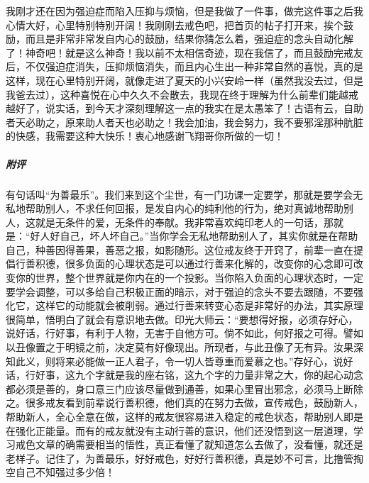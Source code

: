 \begin{case}
    我刚才还在因为强迫症而陷入压抑与烦恼，但是我做了一件事，做完这件事之后我心情大好，心里特别特别开阔！我刚刚去戒色吧，把首页的帖子打开来，挨个鼓励，而且是非常非常发自内心的鼓励，结果你猜怎么着，强迫症的念头自动化解了！神奇吧！就是这么神奇！我以前不太相信奇迹，现在我信了，而且鼓励完戒友后，不仅强迫症消失，压抑烦恼消失，而且内心生出一种非常自然的喜悦，真的是这样，现在心里特别开阔，就像走进了夏天的小兴安岭一样（虽然我没去过，但是我爸去过），这种喜悦在心中久久不会散去，我现在终于理解为什么前辈们能越戒越好了，说实话，到今天才深刻理解这一点的我实在是太愚笨了！古语有云，自助者天必助之，原来助人者天也必助之！我会加油，我会努力，我不要邪淫那种肮脏的快感，我需要这种大快乐！衷心地感谢飞翔哥你所做的一切！
    \subparagraph{附评} 有句话叫“为善最乐”。我们来到这个尘世，有一门功课一定要学，那就是要学会无私地帮助别人，不求任何回报，是发自内心的纯利他的行为，绝对真诚地帮助别人，这就是无条件的爱，无条件的奉献。我非常喜欢纯印老人的一句话，那就是：“好人好自己，坏人坏自己。”当你学会无私地帮助别人了，其实你就是在帮助自己，种善因得善果，善恶之报，如影随形。这位戒友终于开窍了，前辈一直在提倡行善积德，很多负面的心理状态是可以通过行善来化解的，改变你的心念即可改变你的世界，整个世界就是你内在的一个投影。当你陷入负面的心理状态时，一定要学会调整，可以多给自己积极正面的暗示，对于强迫的念头不要去跟随，不要强化它，这样它的动能就会被削弱。通过行善来转变心态是非常好的办法，其实原理很简单，悟明白了就会有意识地去做。印光大师云：“要想得好报，必须存好心，说好话，行好事，有利于人物，无害于自他方可。倘不如此，何好报之可得。譬如以丑像置之于明镜之前，决定莫有好像现出。所现者，与此丑像了无有异。汝果深知此义，则将来必能做一正人君子，令一切人皆尊重而爱慕之也。”存好心，说好话，行好事，这九个字就是我的座右铭，这九个字的力量非常之大，你的起心动念都必须是善的，身口意三门应该尽量做到通善，如果心里冒出邪念，必须马上断除之。很多戒友看到前辈说行善积德，他们真的在努力去做，宣传戒色，鼓励新人，帮助新人，全心全意在做，这样的戒友很容易进入稳定的戒色状态，帮助别人即是在强化正能量。而有的戒友就没有主动行善的意识，他们还没悟到这一层道理，学习戒色文章的确需要相当的悟性，真正看懂了就知道怎么去做了，没看懂，就还是老样子。记住了，为善最乐，好好戒色，好好行善积德，真是妙不可言，比撸管掏空自己不知强过多少倍！
\end{case}

